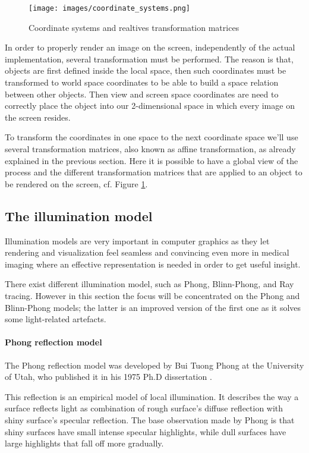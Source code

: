 \documentclass[12pt,a4paper]{extarticle}
\begin{document}
\begin{figure}[hbtp]
\centering
\texttt{[image: images/coordinate\_systems.png]}
\caption{Coordinate systems and realtives transformation matrices}
\label{fig:coordinate_systems}
\end{figure}

In order to properly render an image on the screen, independently of the actual implementation, several transformation must be performed. The reason is that, objects are first defined inside the local space, then such coordinates must be transformed to world space coordinates to be able to build a space relation between other objects. Then view and screen space coordinates are need to correctly place the object into our 2-dimensional space in which every image on the screen resides.


To transform the coordinates in one space to the next coordinate space we'll use several transformation matrices, also known as affine transformation, as already explained in the previous section.
Here it is possible to have a global view of the process and the different transformation matrices that are applied to an object to be rendered on the screen, cf. Figure \ref{fig:coordinate_systems}.

\pagebreak
\subsection{The illumination model} %
Illumination models are very important in computer graphics as they let rendering and visualization feel seamless and convincing even more in medical imaging where an effective representation is needed in order to get useful insight.
 
There exist different illumination model, such as Phong, Blinn-Phong, and Ray tracing. However in this section the focus will be concentrated on the Phong and Blinn-Phong models; the latter is an improved version of the first one as it solves some light-related artefacts.

\paragraph{Phong reflection model} The Phong reflection model was developed by Bui Tuong Phong at the University of Utah, who published it in his 1975 Ph.D dissertation \cite{phong_1975}.

This reflection is an empirical model of local illumination. It describes the way a surface reflects light as combination of rough surface's diffuse reflection with shiny surface's specular reflection. The base observation made by Phong is that shiny surfaces have small intense specular highlights, while dull surfaces have large highlights that fall off more gradually. 
\end{document}
